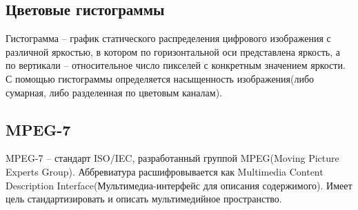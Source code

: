 \subsection{ Цветовые гистограммы}
Гистограмма -- график статического распределения цифрового изображения с различной яркостью, в котором по горизонтальной оси представлена яркость, а по вертикали -- относительное число пикселей с конкретным значением яркости. С помощью гистограммы определяется насыщенность изображения(либо сумарная, либо разделенная по цветовым каналам).

\begin{figure}[ht!]
\end{figure}

\subsection{ MPEG-7}
MPEG-7 -- стандарт ISO/IEC, разработанный группой MPEG(Moving Picture Experts Group). Аббревиатура расшифровывается как Multimedia Content Description Interface(Мультимедиа-интерфейс для описания содержимого). Имеет цель стандартизировать и описать мультимедийное пространство.


